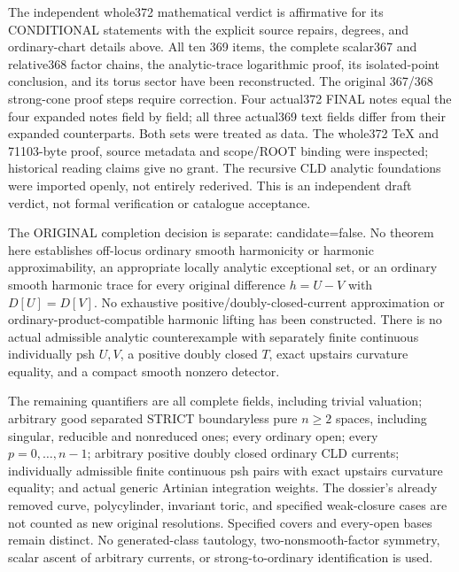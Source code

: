 \documentclass[11pt]{article}
\begin{document}
The independent whole372 mathematical verdict is affirmative for its CONDITIONAL statements with the explicit source repairs, degrees, and ordinary-chart details above. All ten 369 items, the complete scalar367 and relative368 factor chains, the analytic-trace logarithmic proof, its isolated-point conclusion, and its torus sector have been reconstructed. The original 367/368 strong-cone proof steps require correction. Four actual372 FINAL notes equal the four expanded notes field by field; all three actual369 text fields differ from their expanded counterparts. Both sets were treated as data. The whole372 TeX and 71103-byte proof, source metadata and scope/ROOT binding were inspected; historical reading claims give no grant. The recursive CLD analytic foundations were imported openly, not entirely rederived. This is an independent draft verdict, not formal verification or catalogue acceptance.

The ORIGINAL completion decision is separate: candidate=false. No theorem here establishes off-locus ordinary smooth harmonicity or harmonic approximability, an appropriate locally analytic exceptional set, or an ordinary smooth harmonic trace for every original difference \(h=U-V\) with \(D[U]=D[V]\). No exhaustive positive/doubly-closed-current approximation or ordinary-product-compatible harmonic lifting has been constructed. There is no actual admissible analytic counterexample with separately finite continuous individually psh \(U,V\), a positive doubly closed \(T\), exact upstairs curvature equality, and a compact smooth nonzero detector.

The remaining quantifiers are all complete fields, including trivial valuation; arbitrary good separated STRICT boundaryless pure \(n\geq2\) spaces, including singular, reducible and nonreduced ones; every ordinary open; every \(p=0,\ldots,n-1\); arbitrary positive doubly closed ordinary CLD currents; individually admissible finite continuous psh pairs with exact upstairs curvature equality; and actual generic Artinian integration weights. The dossier's already removed curve, polycylinder, invariant toric, and specified weak-closure cases are not counted as new original resolutions. Specified covers and every-open bases remain distinct. No generated-class tautology, two-nonsmooth-factor symmetry, scalar ascent of arbitrary currents, or strong-to-ordinary identification is used.
\end{document}
